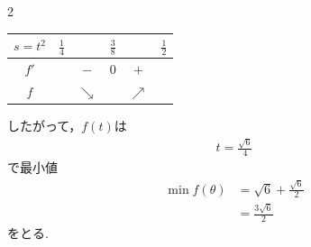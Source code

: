 \documentclass[../../main.tex]{subfiles}
\begin{document}
\begin{multicols}{2}
\begin{table}[H]
\begin{tabular}{|c||c|c|c|c|c|}
      \hline
      $s=t^2$ & $\frac{1}{4}$ &            & $\frac{3}{8}$        &            & $\frac{1}{2}$        \\
      \hline
      $f'$    &               & $-$        & $0$                  & $+$        &                      \\
      \hline
      $f$     &               & $\searrow$ &                      & $\nearrow$ &                      \\
      \hline
    \end{tabular}
  \end{table}
  したがって，$f(t)$は
  \begin{align*}
    t=\frac{\sqrt{6}}{4}
  \end{align*}
  で最小値
  \begin{align*}
    \min f(\theta)
     & = \sqrt{6}+\frac{\sqrt{6}}{2} \\
     & = \frac{3\sqrt{6}}{2}
  \end{align*}
  をとる.


  \newpage
\end{multicols}
\end{document}
